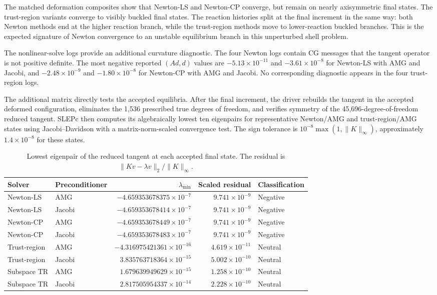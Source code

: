 \documentclass{article}
\begin{document}
The matched deformation composites show that Newton-LS and Newton-CP converge, but
remain on nearly axisymmetric final states.  The trust-region variants converge to
visibly buckled final states.  The reaction histories split at the final increment in
the same way: both Newton methods end at the higher reaction branch, while the
trust-region methods move to lower-reaction buckled branches.  This is the expected
signature of Newton convergence to an unstable equilibrium branch in this unperturbed
shell problem.

The nonlinear-solve logs provide an additional curvature diagnostic.  The four Newton logs contain CG
messages that the tangent operator is not positive definite.  The most negative
reported $(Ad,d)$ values are $-5.13\times10^{-11}$ and $-3.61\times10^{-8}$ for
Newton-LS with AMG and Jacobi, and $-2.48\times10^{-9}$ and $-1.80\times10^{-8}$ for
Newton-CP with AMG and Jacobi.  No corresponding diagnostic appears in the four
trust-region logs.

The additional matrix directly tests the accepted equilibria.  After the final
increment, the driver rebuilds the tangent in the accepted deformed configuration,
eliminates the 1,536 prescribed true degrees of freedom, and verifies symmetry of the
45,696-degree-of-freedom reduced tangent.  SLEPc then computes its algebraically
lowest ten eigenpairs for representative Newton/AMG and trust-region/AMG states
using Jacobi--Davidson with a matrix-norm-scaled convergence test.
The sign tolerance is $10^{-8}\max(1,\lVert K\rVert_\infty)$, approximately
$1.4\times10^{-8}$ for these states.

\begin{table}[h]
  \centering
  \small
  \caption{Lowest eigenpair of the reduced tangent at each accepted final state.
  The residual is $\lVert K v-\lambda v\rVert_2/\lVert K\rVert_\infty$.}
  \begin{tabular}{@{}llrrl@{}}
    \toprule
    Solver & Preconditioner & $\lambda_{\min}$ & Scaled residual & Classification \\
    \midrule
    Newton-LS & AMG & $-4.659353678375\times10^{-7}$ & $9.741\times10^{-9}$ & Negative \\
    Newton-LS & Jacobi & $-4.659353678414\times10^{-7}$ & $9.741\times10^{-9}$ & Negative \\
    Newton-CP & AMG & $-4.659353678449\times10^{-7}$ & $9.741\times10^{-9}$ & Negative \\
    Newton-CP & Jacobi & $-4.659353678483\times10^{-7}$ & $9.741\times10^{-9}$ & Negative \\
    Trust-region & AMG & $-4.316975421361\times10^{-16}$ & $4.619\times10^{-11}$ & Neutral \\
    Trust-region & Jacobi & $3.835763718364\times10^{-15}$ & $5.002\times10^{-10}$ & Neutral \\
    Subspace TR & AMG & $1.679639949629\times10^{-15}$ & $1.258\times10^{-10}$ & Neutral \\
    Subspace TR & Jacobi & $2.817505954337\times10^{-14}$ & $2.228\times10^{-10}$ & Neutral \\
    \bottomrule
  \end{tabular}
\end{table}
\end{document}
